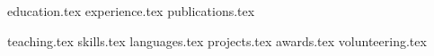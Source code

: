 \documentclass[letterpaper,11pt]{article}
\begin{document}




{education.tex}
{experience.tex}
{publications.tex}

\pagebreak

{teaching.tex}
\sidebyside
{{skills.tex}}
{{languages.tex}}
{projects.tex}
{awards.tex}
{volunteering.tex}
\end{document}
